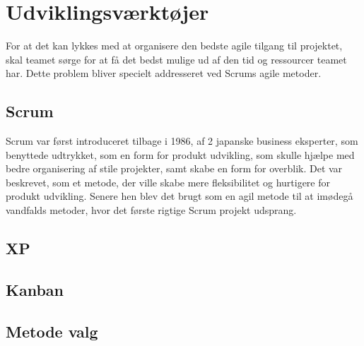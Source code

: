 
\chapter{Udviklingsværktøjer}\label{ch:udviklingsværktøjer}

For at det kan lykkes med at organisere den bedste agile tilgang til projektet, skal teamet sørge for at få det bedst mulige ud af den tid og ressourcer teamet har. Dette problem bliver specielt addresseret ved Scrums agile metoder. 

\section{Scrum}


Scrum var først introduceret tilbage i 1986, af 2 japanske business eksperter, som benyttede udtrykket, som en form for produkt udvikling, som skulle hjælpe med bedre organisering af stile projekter, samt skabe en form for overblik. Det var beskrevet, som et metode, der ville skabe mere fleksibilitet og hurtigere for produkt udvikling. Senere hen blev det brugt som en agil metode til at imødegå vandfalds metoder, hvor det første rigtige Scrum projekt udsprang. \cite{ScrumHistory}


\section{XP}



\section{Kanban}


\section{Metode valg}


 


